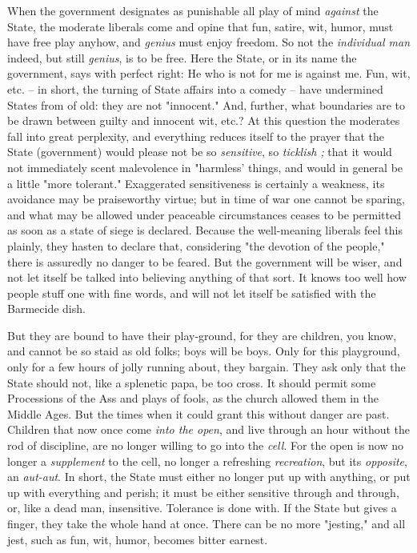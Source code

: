 \documentclass[a4paper]{book}
\begin{document}
When the government designates as punishable all play of mind \textit{against} 
the State, the moderate liberals come and opine that fun, satire, wit, humor, 
must have free play anyhow, and \textit{genius} must enjoy freedom. So not the 
\textit{individual man} indeed, but still \textit{genius}, is to be free. Here 
the State, or in its name the government, says with perfect right: He who is 
not for me is against me. Fun, wit, etc. -- in short, the turning of State 
affairs into a comedy -- have undermined States from of old: they are not 
"{}innocent."{} And, further, what boundaries are to be drawn between guilty 
and innocent wit, etc.? At this question the moderates fall into great 
perplexity, and everything reduces itself to the prayer that the State 
(government) would please not be so \textit{sensitive}, so \textit{ticklish ;} 
that it would not immediately scent malevolence in "{}harmless' things, and 
would in general be a little "{}more tolerant."{} Exaggerated sensitiveness is 
certainly a weakness, its avoidance may be praiseworthy virtue; but in time of 
war one cannot be sparing, and what may be allowed under peaceable 
circumstances ceases to be permitted as soon as a state of siege is declared. 
Because the well-meaning liberals feel this plainly, they hasten to declare 
that, considering "{}the devotion of the people,"{} there is assuredly no 
danger to be feared. But the government will be wiser, and not let itself be 
talked into believing anything of that sort. It knows too well how people 
stuff one with fine words, and will not let itself be satisfied with the 
Barmecide dish.

But they are bound to have their play-ground, for they are children, you know, 
and cannot be so staid as old folks; boys will be boys. Only for this 
playground, only for a few hours of jolly running about, they bargain. They 
ask only that the State should not, like a splenetic papa, be too cross. It 
should permit some Processions of the Ass and plays of fools, as the church 
allowed them in the Middle Ages. But the times when it could grant this 
without danger are past. Children that now once come \textit{into the open}, 
and live through an hour without the rod of discipline, are no longer willing 
to go into the \textit{cell}. For the open is now no longer a 
\textit{supplement} to the cell, no longer a refreshing \textit{recreation}, 
but its \textit{opposite}, an \textit{aut-aut}. In short, the State must 
either no longer put up with anything, or put up with everything and perish; 
it must be either sensitive through and through, or, like a dead man, 
insensitive. Tolerance is done with. If the State but gives a finger, they 
take the whole hand at once. There can be no more "{}jesting,"{} and all jest, 
such as fun, wit, humor, becomes bitter earnest.
\end{document}
